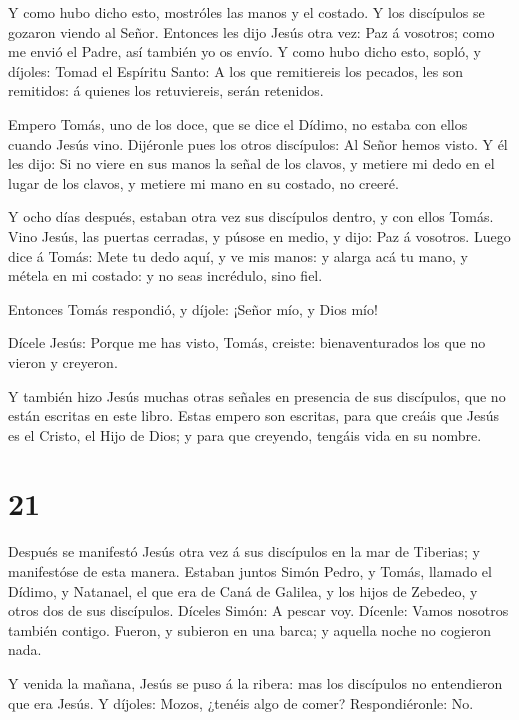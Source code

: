  Y como hubo dicho esto, mostróles las manos y el costado.
Y los discípulos se gozaron viendo al Señor.  Entonces les
dijo Jesús otra vez: Paz á vosotros; como me envió el Padre, así también
yo os envío.  Y como hubo dicho esto, sopló, y díjoles:
Tomad el Espíritu Santo:  A los que remitiereis los
pecados, les son remitidos: á quienes los retuviereis, serán retenidos.

 Empero Tomás, uno de los doce, que se dice el Dídimo, no
estaba con ellos cuando Jesús vino.  Dijéronle pues los
otros discípulos: Al Señor hemos visto. Y él les dijo: Si no viere en
sus manos la señal de los clavos, y metiere mi dedo en el lugar de los
clavos, y metiere mi mano en su costado, no creeré.

 Y ocho días después, estaban otra vez sus discípulos
dentro, y con ellos Tomás. Vino Jesús, las puertas cerradas, y púsose en
medio, y dijo: Paz á vosotros.  Luego dice á Tomás: Mete tu
dedo aquí, y ve mis manos: y alarga acá tu mano, y métela en mi costado:
y no seas incrédulo, sino fiel.

 Entonces Tomás respondió, y díjole: ¡Señor mío, y Dios
mío!

 Dícele Jesús: Porque me has visto, Tomás, creiste:
bienaventurados los que no vieron y creyeron.

 Y también hizo Jesús muchas otras señales en presencia de
sus discípulos, que no están escritas en este libro.  Estas
empero son escritas, para que creáis que Jesús es el Cristo, el Hijo de
Dios; y para que creyendo, tengáis vida en su nombre.

\hypertarget{section-20}{%
\section{21}\label{section-20}}

 Después se manifestó Jesús otra vez á sus discípulos en la
mar de Tiberias; y manifestóse de esta manera.  Estaban
juntos Simón Pedro, y Tomás, llamado el Dídimo, y Natanael, el que era
de Caná de Galilea, y los hijos de Zebedeo, y otros dos de sus
discípulos.  Díceles Simón: A pescar voy. Dícenle: Vamos
nosotros también contigo. Fueron, y subieron en una barca; y aquella
noche no cogieron nada.

 Y venida la mañana, Jesús se puso á la ribera: mas los
discípulos no entendieron que era Jesús.  Y díjoles: Mozos,
¿tenéis algo de comer? Respondiéronle: No.~


